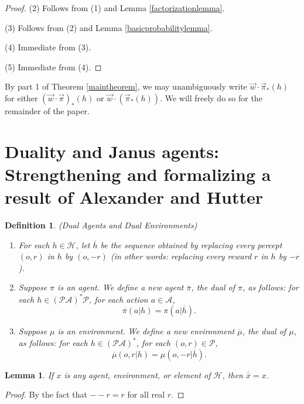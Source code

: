 \documentclass{article}
\newtheorem{definition}[theorem]{Definition}
\newtheorem{lemma}[theorem]{Lemma}
\begin{document}
\begin{proof}
    (2) Follows from (1) and Lemma \ref{factorizationlemma}.

    (3) Follows from (2) and Lemma \ref{basicprobabilitylemma}.

    (4) Immediate from (3).

    (5) Immediate from (4).
\end{proof}

By part 1 of Theorem \ref{maintheorem},
we may unambiguously write $\vec w\cdot \vec\pi_*(h)$
for either $(\vec w\cdot\vec\pi)_*(h)$ or $\vec w\cdot(\vec\pi_*(h))$.
We will freely do so for the remainder of the paper.

\section{Duality and Janus agents:
Strengthening and formalizing a result of Alexander and Hutter}

\begin{definition}
\label{dualagentsdefn}
(Dual Agents and Dual Environments)
\begin{enumerate}
    \item
    For each $h\in\mathcal H$, let $\overline h$ be the sequence obtained
    by replacing every percept $(o,r)$ in $h$ by $(o,-r)$ (in other words:
    replacing every reward $r$ in $h$ by $-r$).
    \item
    Suppose $\pi$ is an agent.
    We define a new agent $\overline \pi$, the \emph{dual} of $\pi$,
    as follows:
    for each $h\in (\mathcal P\mathcal A)^*\mathcal P$,
    for each action $a\in\mathcal A$,
    \[\overline\pi(a|h)=\pi(a|\overline h).\]
    \item
    Suppose $\mu$ is an environment.
    We define a new environment $\overline\mu$, the \emph{dual} of $\mu$,
    as follows:
    for each $h\in (\mathcal P\mathcal A)^*$,
    for each $(o,r)\in\mathcal P$,
    \[\overline\mu(o,r|h)=\mu(o,-r|\overline h).\]
\end{enumerate}
\end{definition}

\begin{lemma}
\label{doublenegationlemma}
    If $x$ is any agent, environment, or element of $\mathcal H$,
    then $\overline{\overline x}=x$.
\end{lemma}

\begin{proof}
    By the fact that $--r=r$ for all real $r$.
\end{proof}
\end{document}
